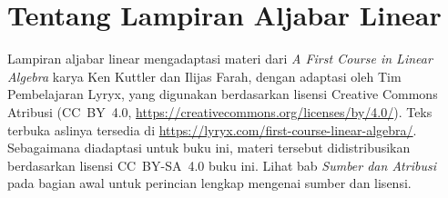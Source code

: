 \section*{Tentang Lampiran Aljabar Linear}

Lampiran aljabar linear mengadaptasi materi dari \emph{A First Course in
Linear Algebra} karya Ken Kuttler dan Ilijas Farah, dengan adaptasi oleh
Tim Pembelajaran Lyryx, yang digunakan berdasarkan lisensi Creative Commons Atribusi
(CC~BY~4.0, \url{https://creativecommons.org/licenses/by/4.0/}).
Teks terbuka aslinya tersedia di
\url{https://lyryx.com/first-course-linear-algebra/}.
Sebagaimana diadaptasi untuk buku ini, materi tersebut didistribusikan berdasarkan
lisensi CC~BY-SA~4.0 buku ini. Lihat bab \emph{Sumber dan Atribusi} pada
bagian awal untuk perincian lengkap mengenai sumber dan lisensi.
